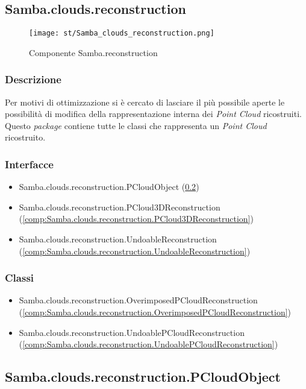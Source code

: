 \newpage
\subsection{Samba.clouds.reconstruction}\label{comp:Samba.clouds.reconstruction}
\begin{figure}[H] 
    \centering 
    \texttt{[image: st/Samba\_clouds\_reconstruction.png]} 
    \caption{Componente Samba.reconstruction}
\end{figure}
\subsubsection{Descrizione}
Per motivi di ottimizzazione si è cercato di lasciare il più possibile aperte le possibilità di modifica della rappresentazione interna dei \emph{Point Cloud} ricostruiti. Questo \emph{package} contiene tutte le classi che rappresenta un \emph{Point Cloud} ricostruito.
\subsubsection{Interfacce}
\begin{itemize}
	\item Samba.clouds.reconstruction.PCloudObject (\ref{comp:Samba.clouds.reconstruction.PCloudObject})
	\item Samba.clouds.reconstruction.PCloud3DReconstruction (\ref{comp:Samba.clouds.reconstruction.PCloud3DReconstruction})
	\item Samba.clouds.reconstruction.UndoableReconstruction (\ref{comp:Samba.clouds.reconstruction.UndoableReconstruction})
\end{itemize}
\subsubsection{Classi}
\begin{itemize}
	\item Samba.clouds.reconstruction.OverimposedPCloudReconstruction (\ref{comp:Samba.clouds.reconstruction.OverimposedPCloudReconstruction})
	\item Samba.clouds.reconstruction.UndoablePCloudReconstruction (\ref{comp:Samba.clouds.reconstruction.UndoablePCloudReconstruction})
\end{itemize}

\subsection{Samba.clouds.reconstruction.PCloudObject}\label{comp:Samba.clouds.reconstruction.PCloudObject}
